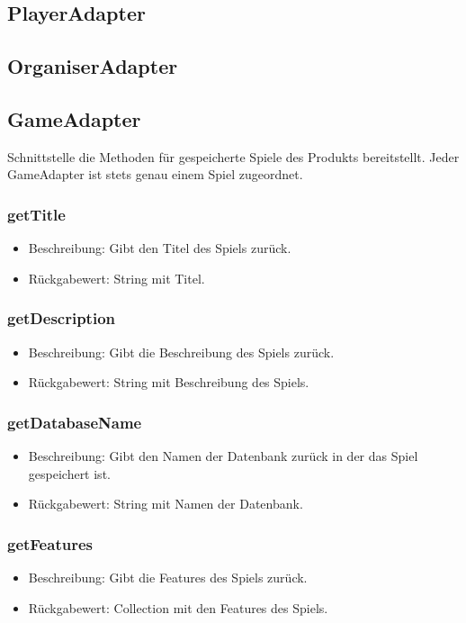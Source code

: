 \documentclass[a4paper]{scrreprt}
\begin{document}
    \subsection{PlayerAdapter}
    \subsection{OrganiserAdapter}
    \subsection{GameAdapter}
    Schnittstelle die Methoden für gespeicherte Spiele des Produkts bereitstellt.
    Jeder GameAdapter ist stets genau einem Spiel zugeordnet.

    \subsubsection{getTitle}
    \begin{itemize}
        \item Beschreibung: Gibt den Titel des Spiels zurück.
        \item Rückgabewert: String mit Titel.
    \end{itemize}

    \subsubsection{getDescription}
    \begin{itemize}
        \item Beschreibung: Gibt die Beschreibung des Spiels zurück.
        \item Rückgabewert: String mit Beschreibung des Spiels.
    \end{itemize}

    \subsubsection{getDatabaseName}
    \begin{itemize}
        \item Beschreibung: Gibt den Namen der Datenbank zurück in der das Spiel gespeichert ist.
        \item Rückgabewert: String mit Namen der Datenbank.
    \end{itemize}

    \subsubsection{getFeatures}
    \begin{itemize}
        \item Beschreibung: Gibt die Features des Spiels zurück.
        \item Rückgabewert: Collection mit den Features des Spiels.
    \end{itemize}
\end{document}
